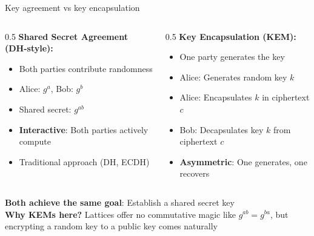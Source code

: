 \ifdefined\PRESENTATION\else\PassOptionsToClass{handout}{beamer}\fi\documentclass[aspectratio=169, lualatex]{beamer}
\begin{document}
\begin{frame}{Key agreement vs key encapsulation}
	\begin{columns}[c]
		\begin{column}{0.5\textwidth}
			\textbf{Shared Secret Agreement (DH-style):}
			\begin{itemize}
				\item Both parties contribute randomness
				\item Alice: $g^a$, Bob: $g^b$
				\item Shared secret: $g^{ab}$
				\item \textbf{Interactive}: Both parties actively compute
				\item Traditional approach (DH, ECDH)
			\end{itemize}
		\end{column}
		\begin{column}{0.5\textwidth}
			\textbf{Key Encapsulation (KEM):}
			\begin{itemize}
				\item One party generates the key
				\item Alice: Generates random key $k$
				\item Alice: Encapsulates $k$ in ciphertext $c$
				\item Bob: Decapsulates key $k$ from ciphertext $c$
				\item \textbf{Asymmetric}: One generates, one recovers
			\end{itemize}
		\end{column}
	\end{columns}
	\vspace{5mm}
	\begin{center}
		\textbf{Both achieve the same goal}: Establish a shared secret key\\
		\textbf{Why KEMs here?} Lattices offer no commutative magic like $g^{ab} = g^{ba}$, but encrypting a random key to a public key comes naturally
	\end{center}
\end{frame}
\end{document}
